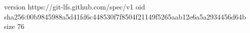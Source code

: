 version https://git-lfs.github.com/spec/v1
oid sha256:00b9845988a5d41fd6c448530f7f8504f21149f5265aab12e6a5a2934456d64b
size 76
